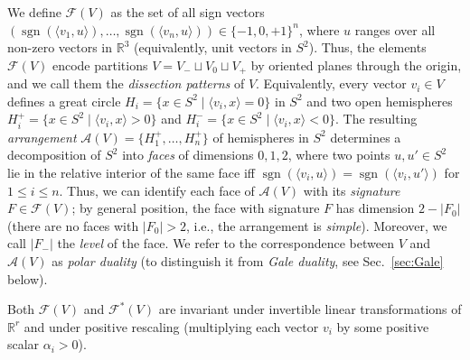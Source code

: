 \documentclass[a4paper,USenglish,cleveref, autoref, thm-restate,nolineno]{socg-lipics-v2021}
\newcommand{\arr}{\mathcal{A}}
\DeclareMathOperator{\sgn}{sgn}
\renewcommand{\leq}{\leqslant}
\newcommand{\R}{\mathbb{R}}
\begin{document}
We define $\mathcal{F}(V)$ as the set of all sign vectors $(\sgn(\langle v_1,u\rangle),\dots,\sgn(\langle v_n,u\rangle)) \in \{-1,0,+1\}^n$, where $u$ ranges over all non-zero vectors in $\R^3$ (equivalently, unit vectors in $S^2$). Thus, the elements $\mathcal{F}(V)$ encode partitions $V=V_-\sqcup V_0 \sqcup V_+$ by oriented planes through the origin, and we call them the \emph{dissection patterns} of $V$. Equivalently, every vector $v_i \in V$ defines a great circle 
$
H_i = \{ x \in S^2 \mid \langle v_i, x \rangle = 0 \}
$
in $S^2$ and two open hemispheres $H_i^+ = \{ x \in S^2 \mid \langle v_i, x \rangle >0 \}$ and $H_i^- = \{ x \in S^2 \mid \langle v_i, x \rangle < 0 \}.$
The resulting \emph{arrangement} $\arr(V)=\{H_1^+,\dots,H_n^+\}$ of hemispheres in $S^2$ determines a decomposition of $S^2$ into \emph{faces} of dimensions $0,1,2$, 
where two points $u,u'\in S^2$ lie in the relative interior of the same face iff $\sgn(\langle v_i,u \rangle)=\sgn(\langle v_i,u'\rangle)$ for $1\leq i\leq n$. Thus, we can identify each face of $\arr(V)$ with its \emph{signature} $F\in \mathcal{F}(V)$; by general position, the face with signature $F$ has dimension $2-|F_0|$ (there are no faces with $|F_0|>2$, i.e., the arrangement is \emph{simple}). Moreover, we call $|F_-|$ the \emph{level} of the face. We 
refer to the correspondence between $V$ and $\mathcal{A}(V)$ as \emph{polar duality} (to distinguish it from \emph{Gale duality}, see Sec.~\ref{sec:Gale} below).

Both $\mathcal{F}(V)$ and $\mathcal{F}^*(V)$ are invariant under invertible linear transformations of $\R^r$ and under positive rescaling (multiplying each vector $v_i$ by some positive scalar $\alpha_i>0$).
\end{document}
